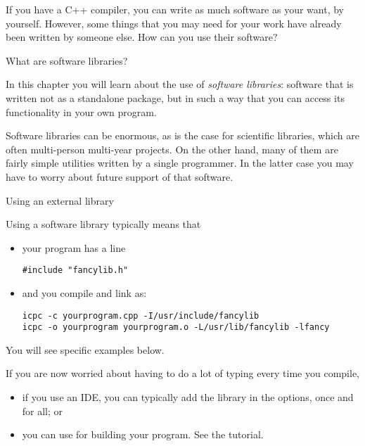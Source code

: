 

If you have a C++ compiler,
you can write as much software as your want, by yourself.
However, some things that you may need for your work
have already been written by someone else.
How can you use their software?

 {What are software libraries?}
\label{sec:makelib}

In this chapter you will learn about the use of
\emph{software libraries}:
software that is written not as a standalone package,
but in such a way that you can access its functionality
in your own program.

Software libraries can be enormous,
as is the case for scientific libraries,
which are often multi-person multi-year projects.
On the other hand, many of them
are fairly simple utilities written by a single programmer.
In the latter case you may have to worry about
future support of that software.

 {Using an external library}

Using a software library typically means that
\begin{itemize}
\item your program has a line
\begin{lstlisting}
#include "fancylib.h"
\end{lstlisting}
\item and you compile and link as:
\begin{verbatim}
icpc -c yourprogram.cpp -I/usr/include/fancylib
icpc -o yourprogram yourprogram.o -L/usr/lib/fancylib -lfancy
\end{verbatim}
\end{itemize}
You will see specific examples below.

If you are now worried about having to do a lot of typing every time you compile,
\begin{itemize}
\item if you use an \ac{IDE}, you can typically add the library in the options,
  once and for all; or
\item you can use  for building your program.
  See the tutorial.
\end{itemize}


